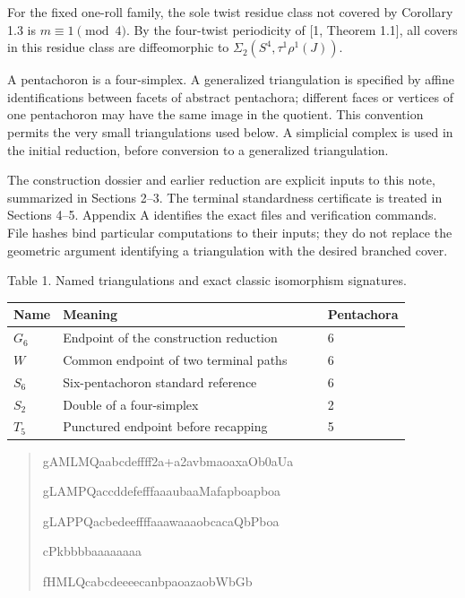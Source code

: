 \documentclass[11pt,letterpaper]{article}
\begin{document}
For the fixed one-roll family, the sole twist residue class not covered by Corollary 1.3 is $m\equiv1\pmod4$. By the four-twist periodicity of [1, Theorem 1.1], all covers in this residue class are diffeomorphic to $\Sigma_2(S^4,\tau^1\rho^1(J))$.

A pentachoron is a four-simplex. A generalized triangulation is specified by affine identifications between facets of abstract pentachora; different faces or vertices of one pentachoron may have the same image in the quotient. This convention permits the very small triangulations used below. A simplicial complex is used in the initial reduction, before conversion to a generalized triangulation.

The construction dossier and earlier reduction are explicit inputs to this note, summarized in Sections 2--3. The terminal standardness certificate is treated in Sections 4--5. Appendix A identifies the exact files and verification commands. File hashes bind particular computations to their inputs; they do not replace the geometric argument identifying a triangulation with the desired branched cover.

\noindent\begin{minipage}{\linewidth}
\begin{center}\small
Table 1. Named triangulations and exact classic isomorphism signatures.\par\smallskip
\begin{tabular}{p{0.08\linewidth}p{0.67\linewidth}p{0.13\linewidth}}
\toprule
\textbf{Name} & \textbf{Meaning} & \textbf{Pentachora} \\
\midrule
$G_6$ & Endpoint of the construction reduction & 6 \\
$W$ & Common endpoint of two terminal paths & 6 \\
$S_6$ & Six-pentachoron standard reference & 6 \\
$S_2$ & Double of a four-simplex & 2 \\
$T_5$ & Punctured endpoint before recapping & 5 \\
\bottomrule
\end{tabular}
\end{center}
\begin{quote}\small
{}\quad \mbox{\small\ttfamily gAMLMQaabcdeffff2a+a2avbmaoaxaOb0aUa}\par
{}\quad \mbox{\small\ttfamily gLAMPQaccddefefffaaaubaaMafapboapboa}\par
{}\quad \mbox{\small\ttfamily gLAPPQacbedeeffffaaawaaaobcacaQbPboa}\par
{}\quad \mbox{\small\ttfamily cPkbbbbaaaaaaaa}\par
{}\quad \mbox{\small\ttfamily fHMLQcabcdeeeecanbpaoazaobWbGb}\par
\end{quote}
\end{minipage}\par\smallskip
\end{document}
